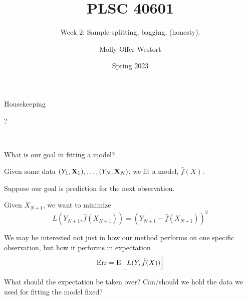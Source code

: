 \documentclass[xcolor={table}, handout]{beamer}
\title{PLSC 40601}
\subtitle{Week 2: Sample-splitting, bagging, (honesty).}
\date{Spring 2023}
\author{Molly Offer-Westort}
\institute{Department of Political Science, \\University of Chicago}
\begin{document}


\frame{\titlepage
\thispagestyle{empty}
}
\begin{frame}{Housekeeping}

\begin{wideitemize}
\item ?
\end{wideitemize}

\end{frame}



\begin{transitionframe}
\centering

\LARGE \textcolor{white}{Sample splitting}

\end{transitionframe}
\begin{frame}{What is our goal in fitting a model?}

\pause
\begin{wideitemize}
\item Given some data $(Y_1, \mathbf{X}_1), \dots, (Y_N, \mathbf{X}_N)$, we fit a model, $\hat{f}(X)$.\pause
\item Suppose our goal is prediction for the next observation. \pause
\item Given $X_{N+1}$, we want to minimize
\[
L\left(Y_{N+1}, \hat{f}(X_{N+1})\right) = \left(Y_{N+1} - \hat{f}(X_{N+1})\right)^2
\]\pause
\item We may be interested not just in how our method performs on one specific observation, but how it performs in expectation
\[
\textrm{Err} = {\textrm E}\, \left[ L(Y, \hat{f}(X))\right]
\]\pause
\item What should the expectation be taken over? \pause Can/should we hold the data we used for fitting the model fixed?
\end{wideitemize}

\end{frame}
\end{document}

